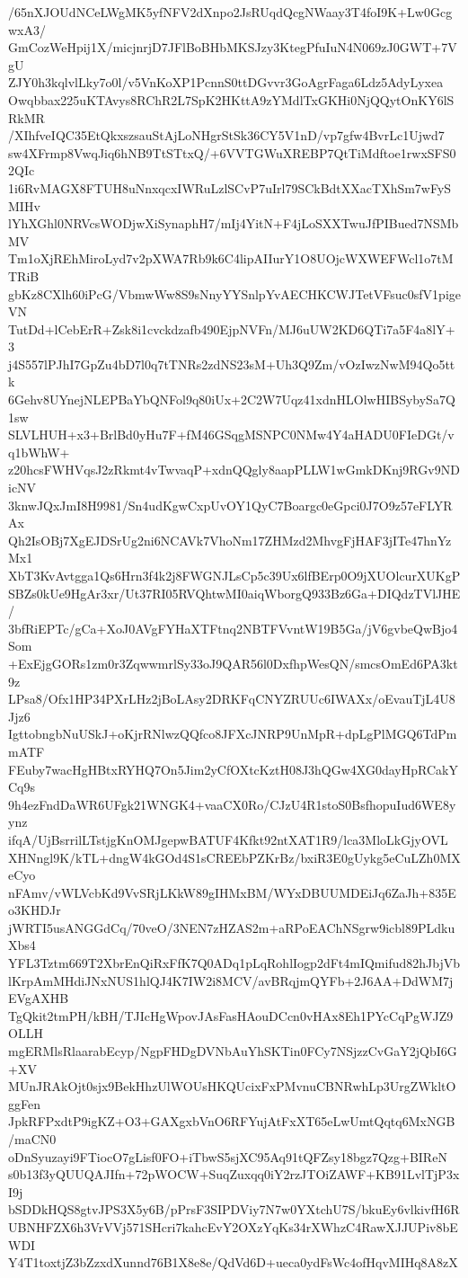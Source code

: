 /65nXJOUdNCeLWgMK5yfNFV2dXnpo2JsRUqdQcgNWaay3T4foI9K+Lw0GcgwxA3/
GmCozWeHpij1X/micjnrjD7JFlBoBHbMKSJzy3KtegPfuIuN4N069zJ0GWT+7VgU
ZJY0h3kqlvlLky7o0l/v5VnKoXP1PcnnS0ttDGvvr3GoAgrFaga6Ldz5AdyLyxea
Owqbbax225uKTAvys8RChR2L7SpK2HKttA9zYMdlTxGKHi0NjQQytOnKY6lSRkMR
/XIhfveIQC35EtQkxszsauStAjLoNHgrStSk36CY5V1nD/vp7gfw4BvrLc1Ujwd7
sw4XFrmp8VwqJiq6hNB9TtSTtxQ/+6VVTGWuXREBP7QtTiMdftoe1rwxSFS02QIc
1i6RvMAGX8FTUH8uNnxqcxIWRuLzlSCvP7uIrl79SCkBdtXXacTXhSm7wFySMIHv
lYhXGhl0NRVcsWODjwXiSynaphH7/mIj4YitN+F4jLoSXXTwuJfPIBued7NSMbMV
Tm1oXjREhMiroLyd7v2pXWA7Rb9k6C4lipAIIurY1O8UOjcWXWEFWcl1o7tMTRiB
gbKz8CXlh60iPcG/VbmwWw8S9sNnyYYSnlpYvAECHKCWJTetVFsuc0sfV1pigeVN
TutDd+lCebErR+Zsk8i1cvckdzafb490EjpNVFn/MJ6uUW2KD6QTi7a5F4a8lY+3
j4S557lPJhI7GpZu4bD7l0q7tTNRs2zdNS23sM+Uh3Q9Zm/vOzIwzNwM94Qo5ttk
6Gehv8UYnejNLEPBaYbQNFol9q80iUx+2C2W7Uqz41xdnHLOlwHIBSybySa7Q1sw
SLVLHUH+x3+BrlBd0yHu7F+fM46GSqgMSNPC0NMw4Y4aHADU0FIeDGt/vq1bWhW+
z20hcsFWHVqsJ2zRkmt4vTwvaqP+xdnQQgly8aapPLLW1wGmkDKnj9RGv9NDicNV
3knwJQxJmI8H9981/Sn4udKgwCxpUvOY1QyC7Boargc0eGpci0J7O9z57eFLYRAx
Qh2IsOBj7XgEJDSrUg2ni6NCAVk7VhoNm17ZHMzd2MhvgFjHAF3jITe47hnYzMx1
XbT3KvAvtgga1Qs6Hrn3f4k2j8FWGNJLsCp5c39Ux6lfBErp0O9jXUOlcurXUKgP
SBZs0kUe9HgAr3xr/Ut37RI05RVQhtwMI0aiqWborgQ933Bz6Ga+DIQdzTVlJHE/
3bfRiEPTc/gCa+XoJ0AVgFYHaXTFtnq2NBTFVvntW19B5Ga/jV6gvbeQwBjo4Som
+ExEjgGORs1zm0r3ZqwwmrlSy33oJ9QAR56l0DxfhpWesQN/smcsOmEd6PA3kt9z
LPsa8/Ofx1HP34PXrLHz2jBoLAsy2DRKFqCNYZRUUc6IWAXx/oEvauTjL4U8Jjz6
IgttobngbNuUSkJ+oKjrRNlwzQQfco8JFXcJNRP9UnMpR+dpLgPlMGQ6TdPmmATF
FEuby7wacHgHBtxRYHQ7On5Jim2yCfOXtcKztH08J3hQGw4XG0dayHpRCakYCq9s
9h4ezFndDaWR6UFgk21WNGK4+vaaCX0Ro/CJzU4R1stoS0BsfhopuIud6WE8yynz
ifqA/UjBsrrilLTstjgKnOMJgepwBATUF4Kfkt92ntXAT1R9/lca3MloLkGjyOVL
XHNngl9K/kTL+dngW4kGOd4S1sCREEbPZKrBz/bxiR3E0gUykg5eCuLZh0MXeCyo
nFAmv/vWLVcbKd9VvSRjLKkW89gIHMxBM/WYxDBUUMDEiJq6ZaJh+835Eo3KHDJr
jWRTI5usANGGdCq/70veO/3NEN7zHZAS2m+aRPoEAChNSgrw9icbl89PLdkuXbs4
YFL3Tztm669T2XbrEnQiRxFfK7Q0ADq1pLqRohlIogp2dFt4mIQmifud82hJbjVb
lKrpAmMHdiJNxNUS1hlQJ4K7IW2i8MCV/avBRqjmQYFb+2J6AA+DdWM7jEVgAXHB
TgQkit2tmPH/kBH/TJIcHgWpovJAsFasHAouDCcn0vHAx8Eh1PYcCqPgWJZ9OLLH
mgERMlsRlaarabEcyp/NgpFHDgDVNbAuYhSKTin0FCy7NSjzzCvGaY2jQbI6G+XV
MUnJRAkOjt0sjx9BekHhzUlWOUsHKQUcixFxPMvnuCBNRwhLp3UrgZWkltOggFen
JpkRFPxdtP9igKZ+O3+GAXgxbVnO6RFYujAtFxXT65eLwUmtQqtq6MxNGB/maCN0
oDnSyuzayi9FTiocO7gLisf0FO+iTbwS5sjXC95Aq91tQFZsy18bgz7Qzg+BIReN
s0b13f3yQUUQAJIfn+72pWOCW+SuqZuxqq0iY2rzJTOiZAWF+KB91LvlTjP3xI9j
bSDDkHQS8gtvJPS3X5y6B/pPrsF3SIPDViy7N7w0YXtchU7S/bkuEy6vlkivfH6R
UBNHFZX6h3VrVVj571SHcri7kahcEvY2OXzYqKs34rXWhzC4RawXJJUPiv8bEWDI
Y4T1toxtjZ3bZzxdXunnd76B1X8e8e/QdVd6D+ueca0ydFsWc4ofHqvMIHq8A8zX
